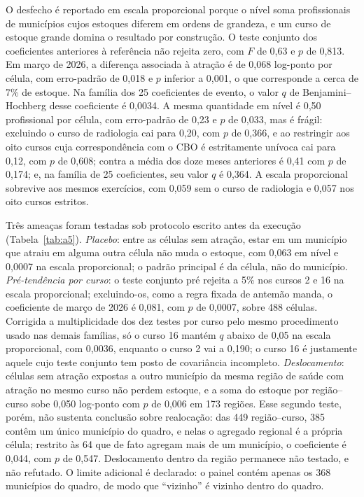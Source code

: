 \documentclass[11pt,a4paper]{article}
\begin{document}
O desfecho é reportado em escala proporcional porque o nível soma profissionais
de municípios cujos estoques diferem em ordens de grandeza, e um curso de
estoque grande domina o resultado por construção. O teste conjunto dos
coeficientes anteriores à referência não rejeita zero, com $F$ de 0,63 e $p$ de
0,813. Em março de 2026, a diferença associada à atração é de 0,068 log-ponto
por célula, com erro-padrão de 0,018 e $p$ inferior a 0,001, o que corresponde
a cerca de 7\% de estoque. Na família dos 25 coeficientes de evento, o valor
$q$ de Benjamini--Hochberg desse coeficiente é 0,0034. A mesma quantidade em
nível é 0,50 profissional por célula, com erro-padrão de 0,23 e $p$ de 0,033,
mas é frágil: excluindo o curso de radiologia cai para 0,20, com $p$ de 0,366,
e ao restringir aos oito cursos cuja correspondência com o CBO é estritamente
unívoca cai para 0,12, com $p$ de 0,608; contra a média dos doze meses
anteriores é 0,41 com $p$ de 0,174; e, na família de 25 coeficientes, seu valor
$q$ é 0,364. A escala proporcional sobrevive aos mesmos exercícios, com 0,059
sem o curso de radiologia e 0,057 nos oito cursos estritos.

Três ameaças foram testadas sob protocolo escrito antes da execução
(Tabela~\ref{tab:a5}). \emph{Placebo}: entre as células sem atração, estar em
um município que atraiu em alguma outra célula não muda o estoque, com 0,063 em
nível e 0,0007 na escala proporcional; o padrão principal é da célula, não do
município. \emph{Pré-tendência por curso}: o teste conjunto pré rejeita a 5\%
nos cursos 2 e 16 na escala proporcional; excluindo-os, como a regra fixada de
antemão manda, o coeficiente de março de 2026 é 0,081, com $p$ de 0,0007, sobre
488 células. Corrigida a multiplicidade dos dez testes por curso pelo mesmo
procedimento usado nas demais famílias, só o curso 16 mantém $q$ abaixo de
0,05 na escala proporcional, com 0,0036, enquanto o curso 2 vai a 0,190; o
curso 16 é justamente aquele cujo teste conjunto tem posto de covariância
incompleto. \emph{Deslocamento}: células sem atração expostas a outro
município da mesma região de saúde com atração no mesmo curso não perdem
estoque, e a soma do estoque por região--curso sobe 0,050 log-ponto com
$p$ de 0,006 em 173 regiões. Esse segundo teste, porém, não sustenta
conclusão sobre realocação: das 449 região--curso, 385 contêm um único
município do quadro, e nelas o agregado regional é a própria célula; restrito
às 64 que de fato agregam mais de um município, o coeficiente é 0,044, com $p$
de 0,547. Deslocamento dentro da região permanece não testado, e não refutado.
O limite adicional é declarado: o painel contém apenas os 368 municípios do
quadro, de modo que ``vizinho'' é vizinho dentro do quadro.
\end{document}
